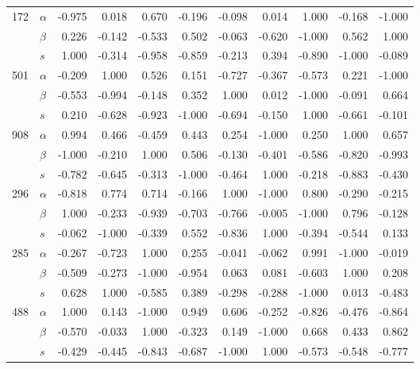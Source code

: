 \begin{longtable}{llrrrrrrrrr}
\cline{1-11}
\multirow{3}{*}{172} & $\alpha$ & -0.975 &  0.018 &  0.670 & -0.196 & -0.098 &  0.014 &  1.000 & -0.168 & -1.000 \\
     & $\beta$ &  0.226 & -0.142 & -0.533 &  0.502 & -0.063 & -0.620 & -1.000 &  0.562 &  1.000 \\
     & $s$ &  1.000 & -0.314 & -0.958 & -0.859 & -0.213 &  0.394 & -0.890 & -1.000 & -0.089 \\
\cline{1-11}
\multirow{3}{*}{501} & $\alpha$ & -0.209 &  1.000 &  0.526 &  0.151 & -0.727 & -0.367 & -0.573 &  0.221 & -1.000 \\
     & $\beta$ & -0.553 & -0.994 & -0.148 &  0.352 &  1.000 &  0.012 & -1.000 & -0.091 &  0.664 \\
     & $s$ &  0.210 & -0.628 & -0.923 & -1.000 & -0.694 & -0.150 &  1.000 & -0.661 & -0.101 \\
\cline{1-11}
\multirow{3}{*}{908} & $\alpha$ &  0.994 &  0.466 & -0.459 &  0.443 &  0.254 & -1.000 &  0.250 &  1.000 &  0.657 \\
     & $\beta$ & -1.000 & -0.210 &  1.000 &  0.506 & -0.130 & -0.401 & -0.586 & -0.820 & -0.993 \\
     & $s$ & -0.782 & -0.645 & -0.313 & -1.000 & -0.464 &  1.000 & -0.218 & -0.883 & -0.430 \\
\cline{1-11}
\multirow{3}{*}{296} & $\alpha$ & -0.818 &  0.774 &  0.714 & -0.166 &  1.000 & -1.000 &  0.800 & -0.290 & -0.215 \\
     & $\beta$ &  1.000 & -0.233 & -0.939 & -0.703 & -0.766 & -0.005 & -1.000 &  0.796 & -0.128 \\
     & $s$ & -0.062 & -1.000 & -0.339 &  0.552 & -0.836 &  1.000 & -0.394 & -0.544 &  0.133 \\
\cline{1-11}
\multirow{3}{*}{285} & $\alpha$ & -0.267 & -0.723 &  1.000 &  0.255 & -0.041 & -0.062 &  0.991 & -1.000 & -0.019 \\
     & $\beta$ & -0.509 & -0.273 & -1.000 & -0.954 &  0.063 &  0.081 & -0.603 &  1.000 &  0.208 \\
     & $s$ &  0.628 &  1.000 & -0.585 &  0.389 & -0.298 & -0.288 & -1.000 &  0.013 & -0.483 \\
\cline{1-11}
\multirow{3}{*}{488} & $\alpha$ &  1.000 &  0.143 & -1.000 &  0.949 &  0.606 & -0.252 & -0.826 & -0.476 & -0.864 \\
     & $\beta$ & -0.570 & -0.033 &  1.000 & -0.323 &  0.149 & -1.000 &  0.668 &  0.433 &  0.862 \\
     & $s$ & -0.429 & -0.445 & -0.843 & -0.687 & -1.000 &  1.000 & -0.573 & -0.548 & -0.777 \\

\end{longtable}

